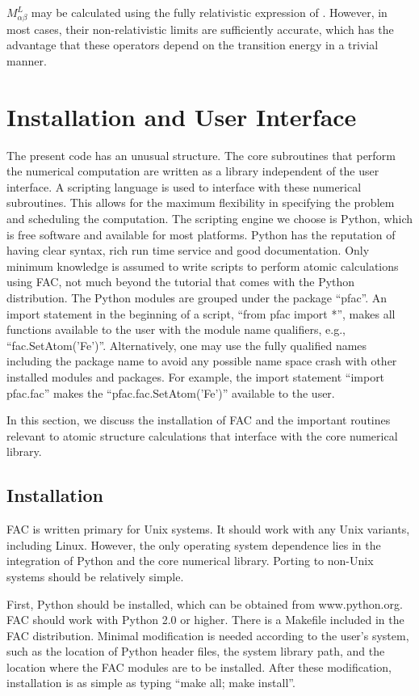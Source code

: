 \documentclass{elsart}
\begin{document}
$M^L_{\alpha\beta}$ may be calculated using the fully relativistic
expression of \citet{grant74}. However, in most cases, their non-relativistic
limits are sufficiently accurate, which has the advantage that these operators
depend on the transition energy in a trivial manner. 

\section{Installation and User Interface}
\label{sec_program}
The present code has an unusual structure. The core subroutines that
perform the numerical computation are written as a library independent of the
user interface. A scripting language is used to interface with these numerical
subroutines. This allows for the maximum flexibility in specifying the problem
and scheduling the computation. The scripting engine we choose is Python, 
which is free software and available for most
platforms. Python has the reputation of having clear syntax, rich run time
service and good documentation. Only minimum knowledge is assumed to write
scripts to perform atomic calculations using FAC, not much beyond the tutorial
that comes with the Python distribution. The Python modules are grouped under
the package ``pfac''. An import statement in the beginning of a script, 
``from pfac import *'', makes all functions available to the user with the
module name qualifiers, e.g., ``fac.SetAtom('Fe')''. Alternatively, one may
use the fully qualified names including the package name to avoid any possible
name space crash with other installed modules and packages. For example,
the import statement ``import pfac.fac'' makes the ``pfac.fac.SetAtom('Fe')''
available to the user. 

In this section, we discuss the
installation of FAC and the important routines relevant to atomic structure
calculations that interface with the core numerical library.

\subsection{Installation}
FAC is written primary for Unix systems. It should work with any Unix variants,
including Linux. However, the only operating system dependence lies in the
integration of Python and the core numerical library. Porting to 
non-Unix systems should be relatively simple. 

First, Python should be installed, which can be obtained from
www.python.org. FAC should work with Python 2.0 or higher. There is a Makefile
included in the FAC distribution. Minimal modification is needed according to
the user's system, such as the location of Python header files, the system
library path, and the location where the FAC modules are to be
installed. After these 
modification, installation is as simple as typing ``make all; make install''. 
\end{document}
